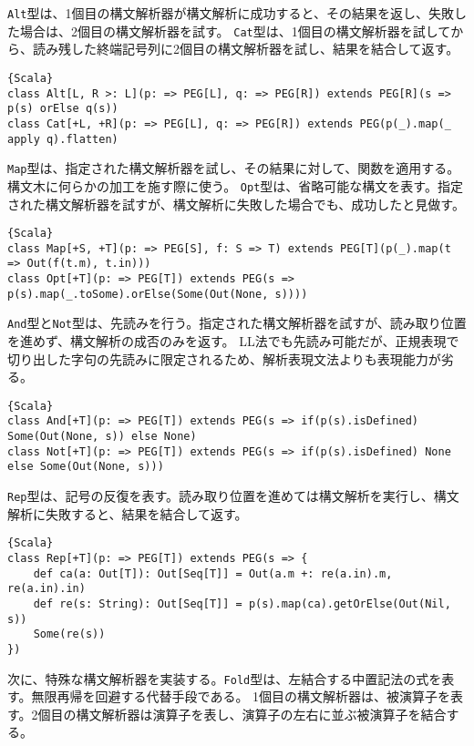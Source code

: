 \documentclass[10pt,a4paper]{book}
\begin{document}
\texttt{Alt}型は、1個目の構文解析器が構文解析に成功すると、その結果を返し、失敗した場合は、2個目の構文解析器を試す。
\texttt{Cat}型は、1個目の構文解析器を試してから、読み残した終端記号列に2個目の構文解析器を試し、結果を結合して返す。

\begin{Verbatim}{Scala}
class Alt[L, R >: L](p: => PEG[L], q: => PEG[R]) extends PEG[R](s => p(s) orElse q(s))
class Cat[+L, +R](p: => PEG[L], q: => PEG[R]) extends PEG(p(_).map(_ apply q).flatten)
\end{Verbatim}

\texttt{Map}型は、指定された構文解析器を試し、その結果に対して、関数を適用する。構文木に何らかの加工を施す際に使う。
\texttt{Opt}型は、省略可能な構文を表す。指定された構文解析器を試すが、構文解析に失敗した場合でも、成功したと見做す。

\begin{Verbatim}{Scala}
class Map[+S, +T](p: => PEG[S], f: S => T) extends PEG[T](p(_).map(t => Out(f(t.m), t.in)))
class Opt[+T](p: => PEG[T]) extends PEG(s => p(s).map(_.toSome).orElse(Some(Out(None, s))))
\end{Verbatim}

\texttt{And}型と\texttt{Not}型は、先読みを行う。指定された構文解析器を試すが、読み取り位置を進めず、構文解析の成否のみを返す。
LL法でも先読み可能だが、正規表現で切り出した字句の先読みに限定されるため、解析表現文法よりも表現能力が劣る。

\begin{Verbatim}{Scala}
class And[+T](p: => PEG[T]) extends PEG(s => if(p(s).isDefined) Some(Out(None, s)) else None)
class Not[+T](p: => PEG[T]) extends PEG(s => if(p(s).isDefined) None else Some(Out(None, s)))
\end{Verbatim}

\texttt{Rep}型は、記号の反復を表す。読み取り位置を進めては構文解析を実行し、構文解析に失敗すると、結果を結合して返す。

\begin{Verbatim}{Scala}
class Rep[+T](p: => PEG[T]) extends PEG(s => {
	def ca(a: Out[T]): Out[Seq[T]] = Out(a.m +: re(a.in).m, re(a.in).in)
	def re(s: String): Out[Seq[T]] = p(s).map(ca).getOrElse(Out(Nil, s))
	Some(re(s))
})
\end{Verbatim}

次に、特殊な構文解析器を実装する。\texttt{Fold}型は、左結合する中置記法の式を表す。無限再帰を回避する代替手段である。
1個目の構文解析器は、被演算子を表す。2個目の構文解析器は演算子を表し、演算子の左右に並ぶ被演算子を結合する。
\end{document}

